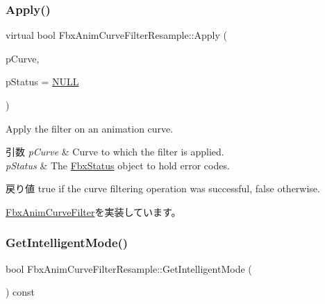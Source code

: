\subsubsection{\texorpdfstring{Apply()}{Apply()}\hspace{0.1cm}{\footnotesize\ttfamily [5/5]}}
{\footnotesize\ttfamily virtual bool Fbx\+Anim\+Curve\+Filter\+Resample\+::\+Apply (\begin{DoxyParamCaption}\item[{\hyperlink{class_fbx_anim_curve}{Fbx\+Anim\+Curve} \&}]{p\+Curve,  }\item[{\hyperlink{class_fbx_status}{Fbx\+Status} $\ast$}]{p\+Status = {\ttfamily \hyperlink{fbxarch_8h_a070d2ce7b6bb7e5c05602aa8c308d0c4}{N\+U\+LL}} }\end{DoxyParamCaption})\hspace{0.3cm}{\ttfamily [virtual]}}

Apply the filter on an animation curve. 
\begin{DoxyParams}{引数}
{\em p\+Curve} & Curve to which the filter is applied. \\
\hline
{\em p\+Status} & The \hyperlink{class_fbx_status}{Fbx\+Status} object to hold error codes. \\
\hline
\end{DoxyParams}
\begin{DoxyReturn}{戻り値}
{\ttfamily true} if the curve filtering operation was successful, {\ttfamily false} otherwise. 
\end{DoxyReturn}


\hyperlink{class_fbx_anim_curve_filter_a6a69996c47c0e6f63a0f8b0d5fa806a0}{Fbx\+Anim\+Curve\+Filter}を実装しています。

\mbox{\label{class_fbx_anim_curve_filter_resample_ae0b81c640c35b6b2d0a34b5586f2f053}} 
\subsubsection{\texorpdfstring{Get\+Intelligent\+Mode()}{GetIntelligentMode()}}
{\footnotesize\ttfamily bool Fbx\+Anim\+Curve\+Filter\+Resample\+::\+Get\+Intelligent\+Mode (\begin{DoxyParamCaption}{ }\end{DoxyParamCaption}) const}

